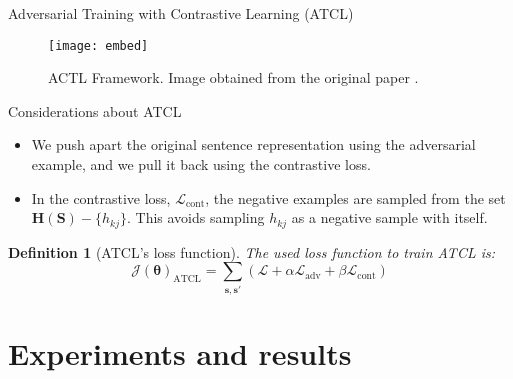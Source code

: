 \documentclass[aspectratio=169]{beamer}
\newtheorem{defi}{Definition}
\begin{document}
  \begin{frame}{Adversarial Training with Contrastive Learning (ATCL)}

    \begin{figure}
    \centering
    \texttt{[image: embed]}
    \caption{ACTL Framework. Image obtained from the original paper \citep{DBLP:journals/corr/abs-2109-09075}.}
    \end{figure}
  \end{frame}

  \begin{frame}{Considerations about ATCL}

    
    \begin{itemize}
      \item We push apart the original sentence representation using the adversarial example, and we pull it back using the contrastive loss.
      
      \item In the contrastive loss, \(\mathcal L_{\text{cont}}\), the negative examples are sampled from the set \(\mathbf{H(S)} - \{h_{kj}\}\). This avoids sampling \(h_{kj}\) as a negative sample with itself.
    \end{itemize}

    \begin{defi}[ATCL's loss function]
      The used loss function to train ATCL is:
      \[
      \mathcal J(\mathbf \theta)_{\text{ATCL}} = \sum_{\mathbf{s},\mathbf{s'}} \left( \mathcal L + \alpha \mathcal L_{\text{adv}} + \beta \mathcal L_{\text{cont}}\right)  
      \]
    \end{defi}

    \end{frame}

  \section{Experiments and results}
\end{document}
